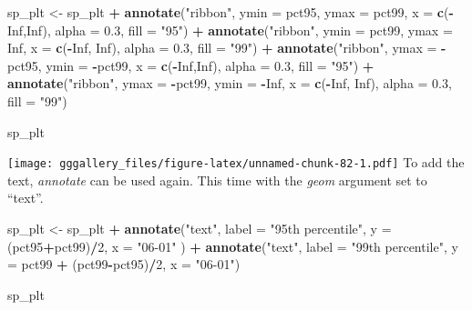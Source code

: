 \documentclass[]{book}
\newenvironment{Shaded}{\begin{snugshade}}{\end{snugshade}}
\newcommand{\DataTypeTok}[1]{\textcolor[rgb]{0.13,0.29,0.53}{#1}}
\newcommand{\DecValTok}[1]{\textcolor[rgb]{0.00,0.00,0.81}{#1}}
\newcommand{\FloatTok}[1]{\textcolor[rgb]{0.00,0.00,0.81}{#1}}
\newcommand{\KeywordTok}[1]{\textcolor[rgb]{0.13,0.29,0.53}{\textbf{#1}}}
\newcommand{\NormalTok}[1]{#1}
\newcommand{\OperatorTok}[1]{\textcolor[rgb]{0.81,0.36,0.00}{\textbf{#1}}}
\newcommand{\OtherTok}[1]{\textcolor[rgb]{0.56,0.35,0.01}{#1}}
\newcommand{\StringTok}[1]{\textcolor[rgb]{0.31,0.60,0.02}{#1}}
\begin{document}
\begin{Shaded}
\begin{Highlighting}[]
\NormalTok{sp_plt <-}\StringTok{ }\NormalTok{sp_plt }\OperatorTok{+}\StringTok{ }
\StringTok{  }\KeywordTok{annotate}\NormalTok{(}\StringTok{"ribbon"}\NormalTok{, }\DataTypeTok{ymin =}\NormalTok{ pct95, }\DataTypeTok{ymax =}\NormalTok{ pct99, }\DataTypeTok{x =} \KeywordTok{c}\NormalTok{(}\OperatorTok{-}\OtherTok{Inf}\NormalTok{,}\OtherTok{Inf}\NormalTok{), }\DataTypeTok{alpha =} \FloatTok{0.3}\NormalTok{, }\DataTypeTok{fill =} \StringTok{"95"}\NormalTok{) }\OperatorTok{+}
\StringTok{  }\KeywordTok{annotate}\NormalTok{(}\StringTok{"ribbon"}\NormalTok{, }\DataTypeTok{ymin =}\NormalTok{ pct99, }\DataTypeTok{ymax =} \OtherTok{Inf}\NormalTok{, }\DataTypeTok{x =} \KeywordTok{c}\NormalTok{(}\OperatorTok{-}\OtherTok{Inf}\NormalTok{, }\OtherTok{Inf}\NormalTok{), }\DataTypeTok{alpha =} \FloatTok{0.3}\NormalTok{, }\DataTypeTok{fill =} \StringTok{"99"}\NormalTok{) }\OperatorTok{+}\StringTok{ }
\StringTok{  }\KeywordTok{annotate}\NormalTok{(}\StringTok{"ribbon"}\NormalTok{, }\DataTypeTok{ymax =} \OperatorTok{-}\NormalTok{pct95, }\DataTypeTok{ymin =} \OperatorTok{-}\NormalTok{pct99, }\DataTypeTok{x =} \KeywordTok{c}\NormalTok{(}\OperatorTok{-}\OtherTok{Inf}\NormalTok{,}\OtherTok{Inf}\NormalTok{), }\DataTypeTok{alpha =} \FloatTok{0.3}\NormalTok{, }\DataTypeTok{fill =} \StringTok{"95"}\NormalTok{) }\OperatorTok{+}\StringTok{ }
\StringTok{  }\KeywordTok{annotate}\NormalTok{(}\StringTok{"ribbon"}\NormalTok{, }\DataTypeTok{ymax =} \OperatorTok{-}\NormalTok{pct99, }\DataTypeTok{ymin =} \OperatorTok{-}\OtherTok{Inf}\NormalTok{, }\DataTypeTok{x =} \KeywordTok{c}\NormalTok{(}\OperatorTok{-}\OtherTok{Inf}\NormalTok{, }\OtherTok{Inf}\NormalTok{), }\DataTypeTok{alpha =} \FloatTok{0.3}\NormalTok{, }\DataTypeTok{fill =} \StringTok{"99"}\NormalTok{) }

\NormalTok{sp_plt }
\end{Highlighting}
\end{Shaded}

\texttt{[image: gggallery\_files/figure-latex/unnamed-chunk-82-1.pdf]}
To add the text, \emph{annotate} can be used again. This time with the \emph{geom} argument set to ``text''.

\begin{Shaded}
\begin{Highlighting}[]
\NormalTok{sp_plt <-}\StringTok{ }\NormalTok{sp_plt }\OperatorTok{+}\StringTok{ }
\StringTok{  }\KeywordTok{annotate}\NormalTok{(}\StringTok{"text"}\NormalTok{, }\DataTypeTok{label =} \StringTok{"95th percentile"}\NormalTok{, }\DataTypeTok{y =}\NormalTok{ (pct95}\OperatorTok{+}\NormalTok{pct99)}\OperatorTok{/}\DecValTok{2}\NormalTok{, }\DataTypeTok{x =} \StringTok{"06-01"}\NormalTok{ ) }\OperatorTok{+}
\StringTok{  }\KeywordTok{annotate}\NormalTok{(}\StringTok{"text"}\NormalTok{, }\DataTypeTok{label =} \StringTok{"99th percentile"}\NormalTok{, }\DataTypeTok{y =}\NormalTok{ pct99 }\OperatorTok{+}\StringTok{ }\NormalTok{(pct99}\OperatorTok{-}\NormalTok{pct95)}\OperatorTok{/}\DecValTok{2}\NormalTok{, }\DataTypeTok{x =} \StringTok{"06-01"}\NormalTok{)}

\NormalTok{sp_plt}
\end{Highlighting}
\end{Shaded}
\end{document}
